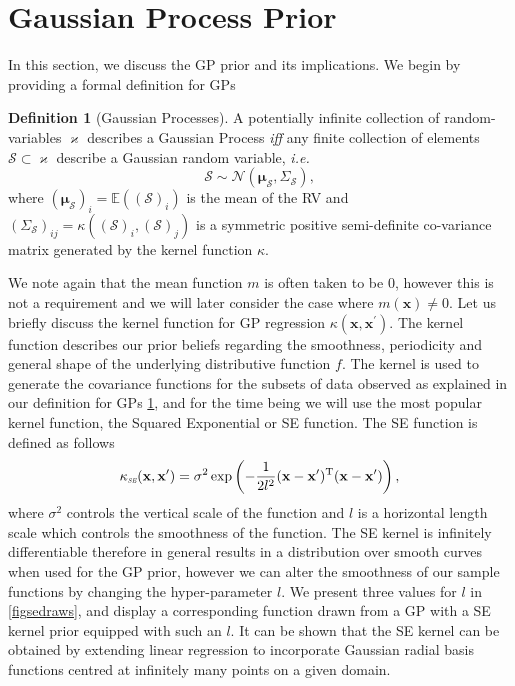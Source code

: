 \documentclass[10pt,a4paper]{article}
\numberwithin{equation}{section}
\theoremstyle{plain}
\theoremstyle{definition}
\newtheorem{definition}{Definition}
\theoremstyle{own}
\begin{document}
\section{Gaussian Process Prior}
In this section, we discuss the GP prior and its implications. We begin by providing a formal definition for GPs
\begin{definition}[Gaussian Processes] \label{defGP}
A potentially infinite collection of random-variables $\varkappa$ describes a Gaussian Process \textit{iff} any finite collection of elements $\mathcal{S} \subset \varkappa$ describe a Gaussian random variable, \textit{i.e.}
\begin{equation}
\mathcal{S} \sim \mathcal{N}(\boldsymbol\mu_\mathcal{S}, \Sigma_\mathcal{S}),
\end{equation}
where $\left( \boldsymbol\mu_\mathcal{S} \right)_i = \mathbb{E}(\left(\mathcal{S}\right)_i)$ is the mean of the RV and $(\Sigma_\mathcal{S})_{ij} = \kappa\left((\mathcal{S})_i, (\mathcal{S})_j\right)$ is a symmetric positive semi-definite co-variance matrix generated by the kernel function $\kappa$.
\end{definition}
We note again that the mean function $m$ is often taken to be 0, however this is not a requirement and we will later consider the case where $m(\mathbf{x}) \neq 0$. Let us briefly discuss the kernel function for GP regression $\kappa(\mathbf{x}, \mathbf{x}^{\prime})$. The kernel function describes our prior beliefs regarding the smoothness, periodicity and general shape of the underlying distributive function $f$. The kernel is used to generate the covariance functions for the subsets of data observed as explained in our definition for GPs \ref{defGP}, and for the time being we will use the most popular kernel function, the Squared Exponential or SE function. The SE function is defined as follows
\begin{equation}
\kappa_{\scaleto{\textit{SE}}{3pt}}(\mathbf{x}, \mathbf{x^{\prime}}) = \sigma^2 \exp \left( -\frac{1}{2l^2} (\mathbf{x} - \mathbf{x}^{\prime})^{\text{T}}(\mathbf{x} - \mathbf{x}^{\prime}) \right),
\end{equation}
where $\sigma^2$ controls the vertical scale of the function and $l$ is a horizontal length scale which controls the smoothness of the function. The SE kernel is infinitely differentiable therefore in general results in a distribution over smooth curves when used for the GP prior, however we can alter the smoothness of our sample functions by changing the hyper-parameter $l$. We present three values for $l$ in \cref{figsedraws}, and display a corresponding function drawn from a GP with a SE kernel prior equipped with such an $l$. It can be shown \cite{RasWil} that the SE kernel can be obtained by extending linear regression to incorporate Gaussian radial basis functions centred at infinitely many points on a given domain.
\end{document}
